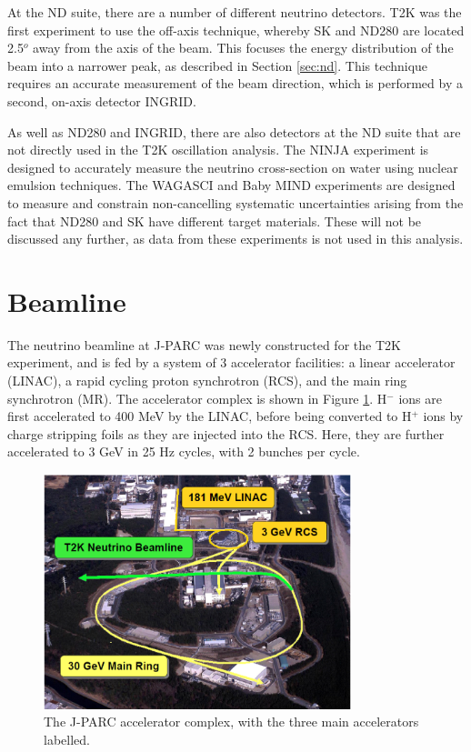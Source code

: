 At the ND suite, there are a number of different neutrino detectors. T2K was the first experiment to use the off-axis technique, whereby SK and ND280 are located 2.5$^o$ away from the axis of the beam. This focuses the energy distribution of the beam into a narrower peak, as described in Section \ref{sec:nd}. This technique requires an accurate measurement of the beam direction, which is performed by a second, on-axis detector INGRID.

As well as ND280 and INGRID, there are also detectors at the ND suite that are not directly used in the T2K oscillation analysis. The NINJA\cite{ninja} experiment is designed to accurately measure the neutrino cross-section on water using nuclear emulsion techniques. The WAGASCI\cite{wagasci} and Baby MIND\cite{babymind} experiments are designed to measure and constrain non-cancelling systematic uncertainties arising from the fact that ND280 and SK have different target materials. These will not be discussed any further, as data from these experiments is not used in this analysis.

\section{Beamline}\label{sec:beam}

The neutrino beamline at J-PARC \cite{jparc} was newly constructed for the T2K experiment, and is fed by a system of 3 accelerator facilities: a linear accelerator (LINAC), a rapid cycling proton synchrotron (RCS), and the main ring synchrotron (MR). The accelerator complex is shown in Figure \ref{jparc}. H$^{-}$ ions are first accelerated to 400 MeV by the LINAC, before being converted to H$^{+}$ ions by charge stripping foils as they are injected into the RCS. Here, they are further accelerated to 3 GeV in 25 Hz cycles, with 2 bunches per cycle.

\begin{figure}[!htbp]
\centering
\includegraphics*[width=0.8\textwidth,clip]{figs/jparc}
\caption{The J-PARC accelerator complex, with the three main accelerators labelled.} \label{jparc}
\end{figure}

